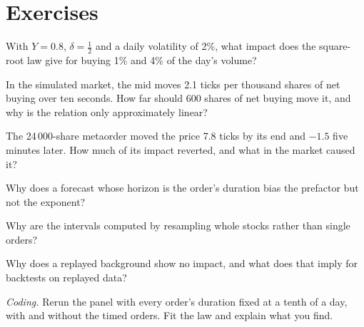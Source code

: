 \section{Exercises}

\begin{exercise}[$\star$]\label{exo:mx:the-empirics-of-price-impact:1}
With $Y=0.8$, $\delta=\tfrac12$ and a daily volatility of 2\%, what impact does the square-root law give for buying 1\% and 4\% of the day's volume?
\end{exercise}

\begin{exercise}[$\star$]\label{exo:mx:the-empirics-of-price-impact:2}
In the simulated market, the mid moves 2.1 ticks per thousand shares of net buying over ten seconds. How far should 600 shares of net buying move it, and
why is the relation only approximately linear?
\end{exercise}

\begin{exercise}[$\star$]\label{exo:mx:the-empirics-of-price-impact:3}
The 24\,000-share metaorder moved the price 7.8 ticks by its end and $-1.5$ five minutes later. How much of its impact reverted, and what in the market
caused it?
\end{exercise}

\begin{exercise}[$\star\star$]\label{exo:mx:the-empirics-of-price-impact:4}
Why does a forecast whose horizon is the order's duration bias the prefactor but not the exponent?
\end{exercise}

\begin{exercise}[$\star\star$]\label{exo:mx:the-empirics-of-price-impact:5}
Why are the intervals computed by resampling whole stocks rather than single orders?
\end{exercise}

\begin{exercise}[$\star\star$]\label{exo:mx:the-empirics-of-price-impact:6}
Why does a replayed background show no impact, and what does that imply for backtests on replayed data?
\end{exercise}

\begin{exercise}[$\star\star\star$]\label{exo:mx:the-empirics-of-price-impact:7}
\emph{Coding.} Rerun the panel with every order's duration fixed at a tenth of a day, with and without the timed orders. Fit the law and explain what you
find.
\end{exercise}


